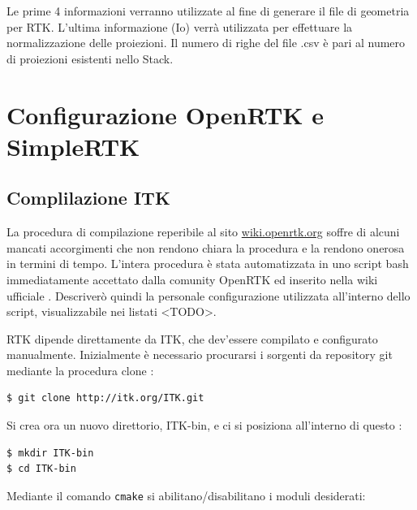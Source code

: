\documentclass[a4paper,11pt, oneside]{article}
\begin{document}
                    Le prime 4 informazioni verranno utilizzate al fine di generare il file di geometria per RTK. L'ultima informazione (Io) verrà utilizzata per effettuare la normalizzazione delle proiezioni. Il numero di righe del file .csv è pari al numero di proiezioni esistenti nello Stack.
                    
                    
                
          
            
        \section{Configurazione OpenRTK e SimpleRTK}
            \subsection{Complilazione ITK}
                \par
                    La procedura di compilazione reperibile al sito \url{wiki.openrtk.org} soffre di alcuni mancati accorgimenti che non rendono chiara la procedura e la rendono onerosa in termini di tempo. L'intera procedura è stata automatizzata in uno script bash immediatamente accettato dalla comunity OpenRTK ed inserito nella wiki ufficiale
                    \cite{wiki-rtk}. Descriverò quindi la personale configurazione utilizzata all'interno dello script, visualizzabile nei listati <TODO>.
                \par    
                    RTK dipende direttamente da ITK, che dev'essere compilato e configurato manualmente. 
                    Inizialmente è necessario procurarsi i sorgenti da repository git mediante la procedura clone :
                    \begin{lstlisting}[language=bash, frame=bt]
$ git clone http://itk.org/ITK.git
                    \end{lstlisting}
                    
                    \bigskip
                    Si crea ora un nuovo direttorio, ITK-bin, e ci si posiziona all'interno di questo :
                    \begin{lstlisting}[language=bash, frame=bt]
$ mkdir ITK-bin
$ cd ITK-bin
                    \end{lstlisting}
                    
                    \bigskip
                    Mediante il comando \texttt{cmake} si abilitano/disabilitano i moduli desiderati:
                    
\end{document}
